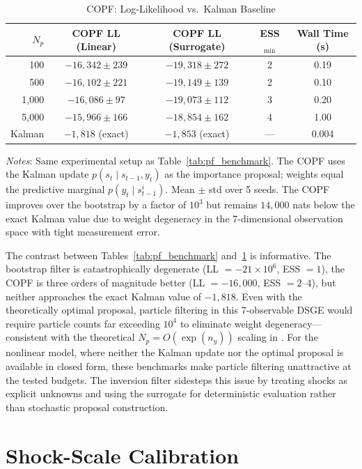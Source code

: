 \documentclass[12pt]{article}
\theoremstyle{plain}
\theoremstyle{definition}
\theoremstyle{remark}
\newcommand{\tablenotes}[1]{%
  \par\vspace{0.5em}%
  \noindent\begin{minipage}{\textwidth}%
  \raggedright\footnotesize #1%
  \end{minipage}\par%
}
\begin{document}
\begin{table}[htbp]
\centering
\caption{COPF: Log-Likelihood vs.\ Kalman Baseline}
\label{tab:copf_benchmark}
\begin{tabular}{rcccc}
\toprule
$N_p$ & COPF LL (Linear) & COPF LL (Surrogate) & ESS$_{\min}$ & Wall Time (s) \\
\midrule
100    & $-16{,}342 \pm 239$ & $-19{,}318 \pm 272$ & 2 & 0.19 \\
500    & $-16{,}102 \pm 221$ & $-19{,}149 \pm 139$ & 2 & 0.10 \\
1{,}000 & $-16{,}086 \pm 97$ & $-19{,}073 \pm 112$ & 3 & 0.20 \\
5{,}000 & $-15{,}966 \pm 166$ & $-18{,}854 \pm 162$ & 4 & 1.00 \\
\midrule
Kalman & $-1{,}818$ (exact) & $-1{,}853$ (exact) & --- & 0.004 \\
\bottomrule
\end{tabular}
\smallskip
\tablenotes{\textit{Notes}: Same experimental setup as Table~\ref{tab:pf_benchmark}. The COPF uses the Kalman update $p(s_t \mid s_{t-1}, y_t)$ as the importance proposal; weights equal the predictive marginal $p(y_t \mid s_{t-1}^i)$. Mean $\pm$ std over 5 seeds. The COPF improves over the bootstrap by a factor of $10^3$ but remains $14{,}000$ nats below the exact Kalman value due to weight degeneracy in the 7-dimensional observation space with tight measurement error.}
\end{table}

The contrast between Tables~\ref{tab:pf_benchmark} and~\ref{tab:copf_benchmark} is informative. The bootstrap filter is catastrophically degenerate (LL $= -21 \times 10^6$, ESS $= 1$), the COPF is three orders of magnitude better (LL $= -16{,}000$, ESS $= 2$--$4$), but neither approaches the exact Kalman value of $-1{,}818$. Even with the theoretically optimal proposal, particle filtering in this 7-observable DSGE would require particle counts far exceeding $10^4$ to eliminate weight degeneracy---consistent with the theoretical $N_p = O(\exp(n_y))$ scaling in \citet{snyder2008obstacles}. For the nonlinear model, where neither the Kalman update nor the optimal proposal is available in closed form, these benchmarks make particle filtering unattractive at the tested budgets. The inversion filter sidesteps this issue by treating shocks as explicit unknowns and using the surrogate for deterministic evaluation rather than stochastic proposal construction.


\section{Shock-Scale Calibration}
\label{app:shock_scale_calibration}
\end{document}
